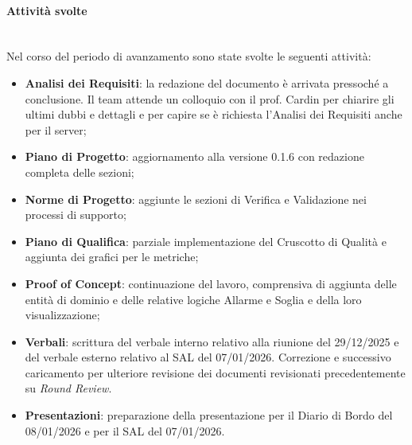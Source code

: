 \documentclass[10pt, letterpaper]{article}
\newcommand{\trisubsection}[1]{\paragraph{#1}\mbox{}\\}
\begin{document}
\trisubsection{Attività svolte}
Nel corso del periodo di avanzamento sono state svolte le seguenti attività:
\begin{itemize}
    \item \textbf{Analisi dei Requisiti}: la redazione del documento è arrivata pressoché a conclusione.
          Il team attende un colloquio con il prof. Cardin per chiarire gli ultimi dubbi e dettagli e per capire
          se è richiesta l'Analisi dei Requisiti anche per il server;
    \item \textbf{Piano di Progetto}: aggiornamento alla versione 0.1.6 con redazione completa delle sezioni;
    \item \textbf{Norme di Progetto}: aggiunte le sezioni di Verifica e Validazione nei processi di supporto;
    \item \textbf{Piano di Qualifica}: parziale implementazione del Cruscotto di Qualità e aggiunta dei grafici per le metriche;
    \item \textbf{Proof of Concept}: continuazione del lavoro, comprensiva di aggiunta delle entità di dominio e delle relative logiche Allarme e Soglia e della loro visualizzazione;
    \item \textbf{Verbali}: scrittura del verbale interno relativo alla riunione del 29/12/2025 e del verbale esterno relativo al SAL del 07/01/2026. Correzione e successivo caricamento per ulteriore revisione
          dei documenti revisionati precedentemente su \textit{Round Review}.
    \item \textbf{Presentazioni}: preparazione della presentazione per il Diario di Bordo del 08/01/2026 e per il SAL del 07/01/2026.

\end{itemize}
\end{document}
